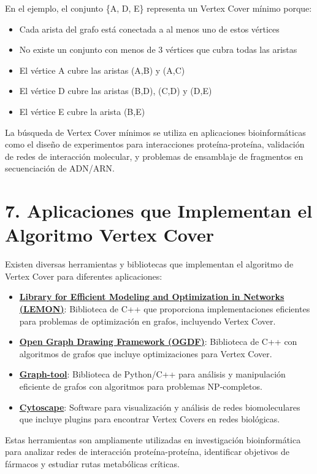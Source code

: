 \documentclass[11pt,a4paper]{article}
\begin{document}
  \noindent En el ejemplo, el conjunto \{A, D, E\} representa un Vertex Cover mínimo porque:
  \begin{itemize}[noitemsep]
    \item Cada arista del grafo está conectada a al menos uno de estos vértices
    \item No existe un conjunto con menos de 3 vértices que cubra todas las aristas
    \item El vértice A cubre las aristas (A,B) y (A,C)
    \item El vértice D cubre las aristas (B,D), (C,D) y (D,E)
    \item El vértice E cubre la arista (B,E)
  \end{itemize}
  
  \noindent La búsqueda de Vertex Cover mínimos se utiliza en aplicaciones bioinformáticas como el diseño de experimentos para interacciones proteína-proteína, validación de redes de interacción molecular, y problemas de ensamblaje de fragmentos en secuenciación de ADN/ARN.
  
  \section*{7. Aplicaciones que Implementan el Algoritmo Vertex Cover}
  
  \noindent Existen diversas herramientas y bibliotecas que implementan el algoritmo de Vertex Cover para diferentes aplicaciones:
  
  \begin{itemize}[noitemsep,topsep=0pt,leftmargin=*]    
    \item \textbf{\href{https://lemon.cs.elte.hu/trac/lemon}{Library for Efficient Modeling and Optimization in Networks (LEMON)}}: Biblioteca de C++ que proporciona implementaciones eficientes para problemas de optimización en grafos, incluyendo Vertex Cover.\\
    
    \item \textbf{\href{https://ogdf.uos.de/}{Open Graph Drawing Framework (OGDF)}}: Biblioteca de C++ con algoritmos de grafos que incluye optimizaciones para Vertex Cover.\\
    
    \item \textbf{\href{https://graph-tool.skewed.de/}{Graph-tool}}: Biblioteca de Python/C++ para análisis y manipulación eficiente de grafos con algoritmos para problemas NP-completos.\\
    
    \item \textbf{\href{https://cytoscape.org/}{Cytoscape}}: Software para visualización y análisis de redes biomoleculares que incluye plugins para encontrar Vertex Covers en redes biológicas.\\
  \end{itemize}
  
  \noindent Estas herramientas son ampliamente utilizadas en investigación bioinformática para analizar redes de interacción proteína-proteína, identificar objetivos de fármacos y estudiar rutas metabólicas críticas.
\end{document}
